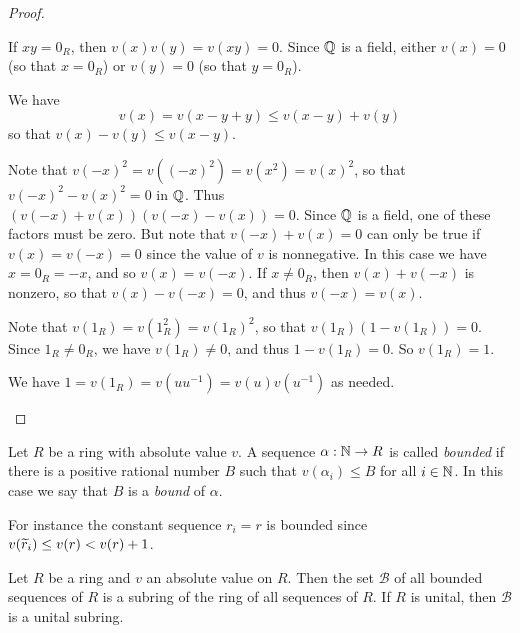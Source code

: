 \begin{proof}
\begin{inlineproplist}
\item If \(xy = 0_R\), then \(v(x)v(y) = v(xy) = 0\).
Since \(\mathbb{Q}\) is a field, either \(v(x) = 0\) (so that \(x = 0_R\)) or \(v(y) = 0\) (so that \(y = 0_R\)).
\item We have \[ v(x) = v(x-y+y) \leq v(x-y) + v(y) \] so that \(v(x) - v(y) \leq v(x-y)\).
\item Note that \(v(-x)^2 = v((-x)^2) = v(x^2) = v(x)^2\), so that \(v(-x)^2 - v(x)^2 = 0\) in \(\mathbb{Q}\).
Thus \((v(-x) + v(x))(v(-x) - v(x)) = 0\).
Since \(\mathbb{Q}\) is a field, one of these factors must be zero.
But note that \(v(-x) + v(x) = 0\) can only be true if \(v(x) = v(-x) = 0\) since the value of \(v\) is nonnegative.
In this case we have \(x = 0_R = -x\), and so \(v(x) = v(-x)\).
If \(x \neq 0_R\), then \(v(x) + v(-x)\) is nonzero, so that \(v(x) - v(-x) = 0\), and thus \(v(-x) = v(x)\).
\item Note that \(v(1_R) = v(1_R^2) = v(1_R)^2\), so that \(v(1_R)(1 - v(1_R)) = 0\).
Since \(1_R \neq 0_R\), we have \(v(1_R) \neq 0\), and thus \(1 - v(1_R) = 0\).
So \(v(1_R) = 1\).
\item We have \(1 = v(1_R) = v(uu^{-1}) = v(u)v(u^{-1})\) as needed.
\end{inlineproplist}
\end{proof}

\begin{dfn}
Let \(R\) be a ring with absolute value \(v\).
A sequence \(\alpha : \mathbb{N} \rightarrow R\) is called \emph{bounded} if there is a positive rational number \(B\) such that \(v(\alpha_i) \leq B\) for all \(i \in \mathbb{N}\).
In this case we say that \(B\) is a \emph{bound} of \(\alpha\).
\end{dfn}

For instance the constant sequence \(r_i = r\) is bounded since \(v(\widetilde{r}_i) \leq v(r) < v(r) + 1\).

\begin{prop}
Let \(R\) be a ring and \(v\) an absolute value on \(R\).
Then the set \(\mathcal{B}\) of all bounded sequences of \(R\) is a subring of the ring of all sequences of \(R\).
If \(R\) is unital, then \(\mathcal{B}\) is a unital subring.
\end{prop}

